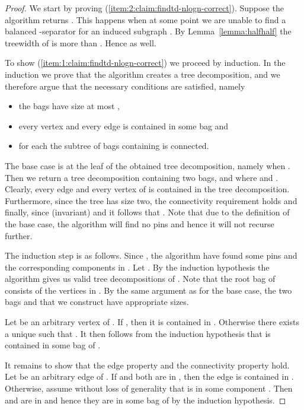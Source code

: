 \documentclass[a4paper,11pt]{article}
\theoremstyle{definition}
\theoremstyle{remark}
\begin{document}
\begin{proof}
  We start by proving (\ref{item:2:claim:findtd-nlogn-correct}).
  Suppose the algorithm returns .  This happens when at some
  point we are unable to find a balanced -separator for an induced
  subgraph .  By Lemma~\ref{lemma:halfhalf} the
  treewidth of  is more than .  Hence  as well.
  
  To show (\ref{item:1:claim:findtd-nlogn-correct}) we proceed by
  induction.  In the induction we prove that the algorithm creates a
  tree decomposition, and we therefore argue that the necessary
  conditions are satisfied, namely
  \begin{itemize}
  \item the bags have size at most ,
  \item every vertex and every edge is contained in some bag and
  \item for each  the subtree of bags containing  is
    connected.
  \end{itemize}
  The base case is at the leaf of the obtained tree decomposition,
  namely when .  Then we return a tree
  decomposition containing two bags,  and  where 
  and .  Clearly, every edge and every vertex of
   is contained in the tree
  decomposition.  Furthermore, since the tree has size two, the
  connectivity requirement holds and finally, since 
  (invariant) and  it follows that .  Note that due to the definition of the base case, the
  algorithm will find no pins and hence it will not recurse further.
  
The induction step is as follows.  Since ,
  the algorithm have found some pins  and
  the corresponding components  in .  Let .
  By the induction hypothesis the algorithm gives us valid tree
  decompositions  of .  Note that the root bag
  of  consists of the vertices in .  By the same argument
  as for the base case, the two bags  and 
  that we construct have appropriate sizes.


  Let  be an arbitrary vertex of .  If , then
  it is contained in .  Otherwise there exists a unique  such
  that .  It then follows from the induction hypothesis
  that  is contained in some bag of .
  
It remains to show that the edge property and the connectivity
  property hold.  Let  be an arbitrary edge of .  If
   and  both are in , then the edge is contained in
  .  Otherwise, assume without loss of generality that  is in
  some component .  Then  and  are in  and
  hence they are in some bag of  by the induction hypothesis.
  

\end{proof}
\end{document}
